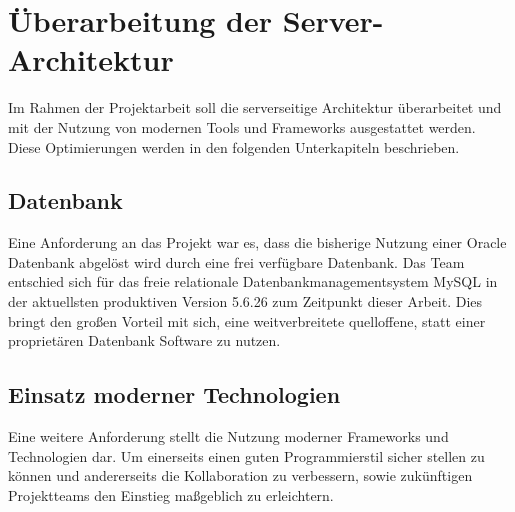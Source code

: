 \section{Überarbeitung der Server-Architektur}
	Im Rahmen der Projektarbeit soll die serverseitige Architektur überarbeitet
	und mit der Nutzung von modernen Tools und Frameworks ausgestattet werden.
	Diese Optimierungen werden in den folgenden Unterkapiteln beschrieben.
	
	\subsection{Datenbank}
		Eine Anforderung an das Projekt war es, dass die bisherige Nutzung einer
		Oracle Datenbank abgelöst wird durch eine frei verfügbare Datenbank. Das Team
		entschied sich für das freie relationale Datenbankmanagementsystem MySQL in
		der aktuellsten produktiven Version 5.6.26 zum Zeitpunkt dieser Arbeit.
		Dies bringt den großen Vorteil mit sich, eine weitverbreitete quelloffene, statt
		einer proprietären Datenbank Software zu nutzen.
		
	\subsection{Einsatz moderner Technologien}
		Eine weitere Anforderung stellt die Nutzung moderner Frameworks und
		Technologien dar. Um einerseits einen guten Programmierstil sicher stellen zu
		können und andererseits die Kollaboration zu verbessern, sowie zukünftigen
		Projektteams den Einstieg maßgeblich zu erleichtern.

